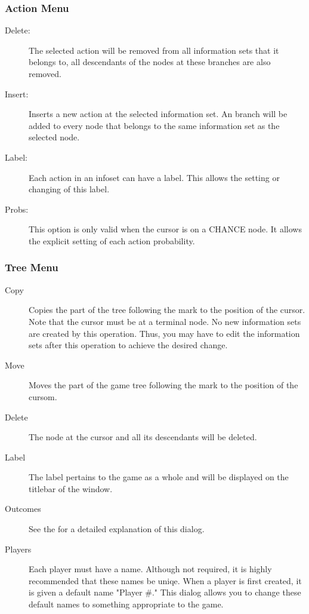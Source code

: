 \subsubsection{Action Menu}
\begin{description}
\item[Delete:]  The selected action will be removed from all information sets 
that it belongs to, all descendants of the nodes at these branches are also removed. 
\item[Insert:]  Inserts a new action at the selected information set.  An branch 
will be added to every node that belongs to the same information set as the 
selected node. 
\item[Label:]  Each action in an infoset can have a label. 
This allows the setting or changing of this label. 
\item[Probs:]  This option is only valid when the cursor is on a
CHANCE node.  It allows the explicit setting of each action probability.
\end{description}

\subsubsection{Tree Menu}
\begin{description}
\item[Copy] Copies the part of the tree following the mark to the 
position of the cursor.  Note that the cursor must be at a terminal node.  No 
new information sets are created by this operation.  Thus, you may have to edit the 
information sets after this operation to achieve the desired change. 
\item[Move] Moves the part of the game tree following the mark to the position of 
the cursom.  
\item[Delete]  The node at the cursor and all its descendants will be deleted.
\item[Label]  The label pertains to the game as a whole and will be
displayed on the titlebar of the window.
\item[Outcomes]  See the  
for a detailed explanation of this dialog.
\item[Players]  Each player must have a name.  Although not required, it
is highly recommended that these names be uniqe.  When a player is first
created, it is given a default name "Player \#."  This dialog allows you to
change these default names to something appropriate to the game.
\end{description}

